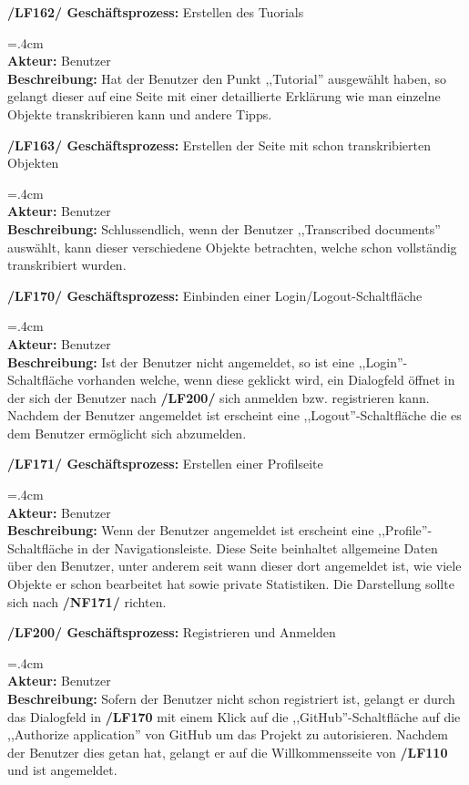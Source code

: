 \documentclass{article}
\newenvironment{funcD}{\vspace{-.6cm}\\\par\begingroup\leftskip=.4cm\noindent\\}{\\\par\endgroup\noindent}
\begin{document}
\textbf{/LF162/ Geschäftsprozess:} Erstellen des Tuorials
\begin{funcD}
    \textbf{Akteur:} Benutzer\vspace{.1cm}\\
    \textbf{Beschreibung:} Hat der Benutzer den Punkt ,,Tutorial'' ausgewählt haben, so gelangt dieser auf eine Seite mit einer detaillierte Erklärung wie man einzelne Objekte transkribieren kann und andere Tipps. 
\end{funcD}
\textbf{/LF163/ Geschäftsprozess:} Erstellen der Seite mit schon transkribierten Objekten
\begin{funcD}
    \textbf{Akteur:} Benutzer\vspace{.1cm}\\
    \textbf{Beschreibung:} Schlussendlich, wenn der Benutzer ,,Transcribed documents'' auswählt, kann dieser verschiedene Objekte betrachten, welche schon vollständig transkribiert wurden. 
\end{funcD}
\textbf{/LF170/ Geschäftsprozess:} Einbinden einer Login/Logout-Schaltfläche
\begin{funcD}
    \textbf{Akteur:} Benutzer\vspace{.1cm}\\
    \textbf{Beschreibung:} Ist der Benutzer nicht angemeldet, so ist eine ,,Login''-Schaltfläche vorhanden welche, wenn diese geklickt wird, ein Dialogfeld öffnet in der sich der Benutzer nach \textbf{/LF200/} sich anmelden bzw. registrieren kann. Nachdem der Benutzer angemeldet ist erscheint eine ,,Logout''-Schaltfläche die es dem Benutzer ermöglicht sich abzumelden. 
\end{funcD}
\textbf{/LF171/ Geschäftsprozess:} Erstellen einer Profilseite
\begin{funcD}
    \textbf{Akteur:} Benutzer\vspace{.1cm}\\
    \textbf{Beschreibung:} Wenn der Benutzer angemeldet ist erscheint eine ,,Profile''-Schaltfläche in der Navigationsleiste. Diese Seite beinhaltet allgemeine Daten über den Benutzer, unter anderem seit wann dieser dort angemeldet ist, wie viele Objekte er schon bearbeitet hat sowie private Statistiken. Die Darstellung sollte sich nach \textbf{/NF171/} richten.
\end{funcD}
\textbf{/LF200/ Geschäftsprozess:} Registrieren und Anmelden
\begin{funcD}
    \textbf{Akteur:} Benutzer\vspace{.1cm}\\
    \textbf{Beschreibung:} Sofern der Benutzer nicht schon registriert ist, gelangt er durch das Dialogfeld in \textbf{/LF170} mit einem Klick auf die ,,GitHub''-Schaltfläche auf die ,,Authorize application'' von GitHub um das Projekt zu autorisieren. Nachdem der Benutzer dies getan hat, gelangt er auf die Willkommensseite von \textbf{/LF110} und ist angemeldet. 
\end{funcD}
\end{document}
